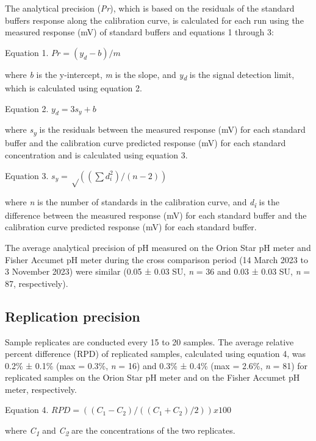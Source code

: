 \documentclass[
]{article}
\begin{document}
The analytical precision (\emph{Pr}), which is based on the residuals of
the standard buffers response along the calibration curve, is calculated
for each run using the measured response (mV) of standard buffers and
equations 1 through 3:

Equation 1. \(Pr = (y_d-b)/m\)

where \emph{b} is the y-intercept, \emph{m} is the slope, and
\emph{y\textsubscript{d}} is the signal detection limit, which is
calculated using equation 2.

Equation 2. \(y_d = 3s_y+b\)

where \emph{s\textsubscript{y}} is the residuals between the measured
response (mV) for each standard buffer and the calibration curve
predicted response (mV) for each standard concentration and is
calculated using equation 3.

Equation 3. \(s_y = √((∑d_i^2 )/(n-2))\)

where \emph{n} is the number of standards in the calibration curve, and
\emph{d\textsubscript{i}} is the difference between the measured
response (mV) for each standard buffer and the calibration curve
predicted response (mV) for each standard buffer.

The average analytical precision of pH measured on the Orion Star pH
meter and Fisher Accumet pH meter during the cross comparison period (14
March 2023 to 3 November 2023) were similar (0.05 ± 0.03 SU, \emph{n} =
36 and 0.03 ± 0.03 SU, \emph{n} = 87, respectively).

\subsection{Replication precision}

Sample replicates are conducted every 15 to 20 samples. The average
relative percent difference (RPD) of replicated samples, calculated
using equation 4, was 0.2\% ± 0.1\% (max = 0.3\%, \emph{n} = 16) and
0.3\% ± 0.4\% (max = 2.6\%, \emph{n} = 81) for replicated samples on the
Orion Star pH meter and on the Fisher Accumet pH meter, respectively.

Equation 4. \(RPD = ((C_1-C_2)/((C_1+C_2)/2)) x 100\)

where \emph{C\textsubscript{1}} and \emph{C\textsubscript{2}} are the
concentrations of the two replicates.
\end{document}
